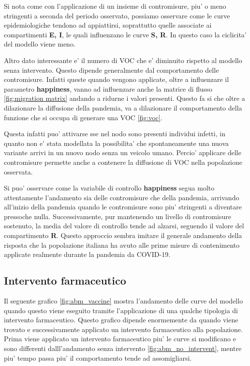 Si nota come con l'applicazione di un insieme di contromisure, piu' o meno stringenti a seconda del periodo osservato, 
possiamo osservare come le curve epidemiologiche tendono ad appiattirsi, soprattutto quelle associate ai compartimenti 
\textbf{E, I}, le quali influenzano le curve \textbf{S, R}. In questo caso la ciclicita' del modello viene meno. 

Altro dato interessante e' il numero di VOC che e' diminuito rispetto al modello senza intervento.
Questo dipende generalmente dal comportamento delle contromisure. Infatti queste quando vengono applicate, 
oltre a influenzare il parametro \textbf{happiness}, vanno ad influenzare anche la matrice di flusso \ref{fig:migration matrix}
andando a ridurne i valori presenti. Questo fa si che oltre a dilazionare la diffusione della pandemia, 
va a dilazionare il comportamento della funzione che si occupa di generare una VOC \ref{fig:voc}. 

Questa infatti puo' attivarse sse nel nodo sono presenti individui infetti, in quanto non e' stata modellata la 
possibilita' che spontaneamente una nuova variante arrivi in un nuovo nodo senza un veicolo umano. Percio' 
applicare delle contromisure permette anche a contenere la diffusione di VOC nella popolazione osservata.

Si puo' osservare come la variabile di controllo \textbf{happiness} segua molto attentamente l'andamento sia delle 
contromisure che della pandemia, arrivando all'inizio della pandemia quando le contromisure sono piu' stringenti 
a diventare pressoche nulla. Successivamente, pur mantenendo un livello di contromisure sostenuto, la media
del valore di controllo tende ad alzarsi, seguendo il valore del compartimento \textbf{R}. Questo approccio sembra 
imitare il generale andamento della risposta che la popolazione italiana ha avuto alle prime misure di contenimento 
applicate realmente durante la pandemia da COVID-19.

\subsection{Intervento farmaceutico}
Il seguente grafico \ref{fig:abm_vaccine} mostra l'andamento delle curve del modello
quando questo viene eseguito tramite l'applicazione di una qualche tipologia di intervento farmaceutico.
Questo grafico dipende enormemente da quando viene trovato e successivamente applicato un intervento 
farmaceutico alla popolazione. Prima viene applicato un intervento farmaceutico piu' le curve si modificano 
e sono differenti dalll'andamento senza intervento \ref{fig:abm_no_intervent}, mentre piu' tempo passa piu'
il comportamento tende ad assomigliarsi.

